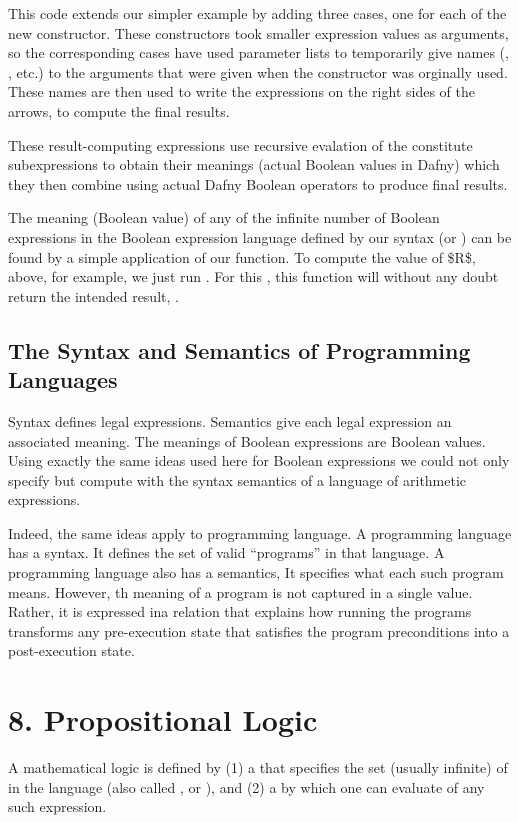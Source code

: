\documentclass[letterpaper,10pt,english]{sphinxmanual}
\begin{document}
This code extends our simpler example by adding three cases, one for
each of the new constructor. These constructors took smaller
expression values as arguments, so the corresponding cases have used
parameter lists to temporarily give names (, , etc.) to the
arguments that were given when the constructor was orginally used.
These names are then used to write the expressions on the right sides
of the arrows, to compute the final results.

These result-computing expressions use recursive evalation of the
constitute subexpressions to obtain their meanings (actual Boolean
values in Dafny) which they then combine using actual Dafny Boolean
operators to produce final results.

The meaning (Boolean value) of any of the infinite number of Boolean
expressions in the Boolean expression language defined by our syntax
(or ) can be found by a simple application of our 
function. To compute the value of \$R\$, above, for example, we just run
. For this , this function will without any doubt return
the intended result, .


\section{The Syntax and Semantics of Programming Languages}
\label{\detokenize{07-boolean-algebra:the-syntax-and-semantics-of-programming-languages}}
Syntax defines legal expressions. Semantics give each legal expression
an associated meaning. The meanings of Boolean expressions are Boolean
values. Using exactly the same ideas used here for Boolean expressions
we could not only specify but compute with the syntax semantics of a
language of arithmetic expressions.

Indeed, the same ideas apply to programming language. A programming
language has a syntax. It defines the set of valid “programs” in that
language. A programming language also has a semantics, It specifies
what each such program means. However, th meaning of a program is not
captured in a single value. Rather, it is expressed ina relation that
explains how running the programs transforms any pre-execution state
that satisfies the program preconditions into a post-execution state.


\chapter{8. Propositional Logic}
\label{\detokenize{08-propositional-logic::doc}}\label{\detokenize{08-propositional-logic:propositional-logic}}
A mathematical logic is defined by (1) a  that specifies the
set (usually infinite) of  in the language
(also called , or ), and (2) a 
by which one can evaluate  of any such expression.
\end{document}
